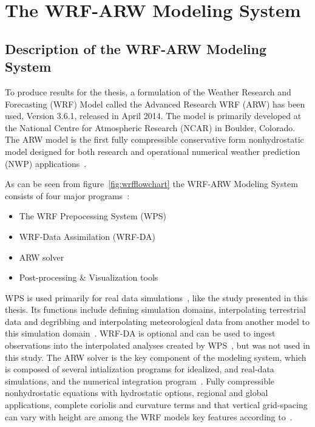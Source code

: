 \chapter{The WRF-ARW Modeling System}
\label{chap:modmet}
\section{Description of the WRF-ARW Modeling System}
\label{sec:modeldes}
To produce results for the thesis, a formulation of the Weather Research and Forecasting (WRF) Model called the Advanced Research WRF (ARW) has been used, Version 3.6.1, released in April 2014. The model is primarily developed at the National Centre for Atmospheric Research (NCAR) in Boulder, Colorado. The ARW model is the first fully compressible conservative form nonhydrostatic model designed for both research and operational numerical weather prediction (NWP) applications~\citep{Skamarock2008}. 

As can be seen from figure~\ref{fig:wrfflowchart} the WRF-ARW Modeling System consists of four major programs~\citep{Wang2015}:
\begin{itemize}
\item The WRF Prepocessing System (WPS)
\item WRF-Data Assimilation (WRF-DA)
\item ARW solver
\item Post-processing \& Visualization tools
\end{itemize}

WPS is used primarily for real data simulations~\citep{Wang2015}, like the study presented in this thesis. Its functions include defining simulation domains, interpolating terrestrial data and degribbing and interpolating meteorological data from another model to this simulation domain~\citep{Wang2015}. WRF-DA is optional and can be used to ingest observations into the interpolated analyses created by WPS~\citep{Wang2015}, but was not used in this study. The ARW solver is the key component of the modeling system, which is composed of several intialization programs for idealized, and real-data simulations, and the numerical integration program~\citep{Wang2015}. Fully compressible nonhydrostatic equations with hydrostatic options, regional and global applications, complete coriolis and curvature terms and that vertical grid-spacing can vary with height are among the WRF models key features according to~\citet{Wang2015}.

